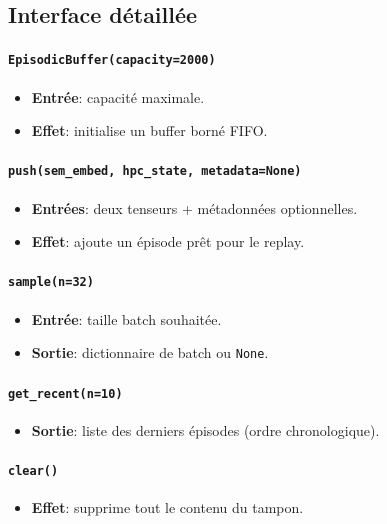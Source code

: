 \documentclass[12pt,a4paper]{article}
\begin{document}
\subsection{Interface détaillée}

\paragraph{\texttt{EpisodicBuffer(capacity=2000)}}
\begin{itemize}[leftmargin=*]
    \item \textbf{Entrée}: capacité maximale.
    \item \textbf{Effet}: initialise un buffer borné FIFO.
\end{itemize}

\paragraph{\texttt{push(sem\_embed, hpc\_state, metadata=None)}}
\begin{itemize}[leftmargin=*]
    \item \textbf{Entrées}: deux tenseurs + métadonnées optionnelles.
    \item \textbf{Effet}: ajoute un épisode prêt pour le replay.
\end{itemize}

\paragraph{\texttt{sample(n=32)}}
\begin{itemize}[leftmargin=*]
    \item \textbf{Entrée}: taille batch souhaitée.
    \item \textbf{Sortie}: dictionnaire de batch ou \texttt{None}.
\end{itemize}

\paragraph{\texttt{get\_recent(n=10)}}
\begin{itemize}[leftmargin=*]
    \item \textbf{Sortie}: liste des derniers épisodes (ordre chronologique).
\end{itemize}

\paragraph{\texttt{clear()}}
\begin{itemize}[leftmargin=*]
    \item \textbf{Effet}: supprime tout le contenu du tampon.
\end{itemize}
\end{document}
